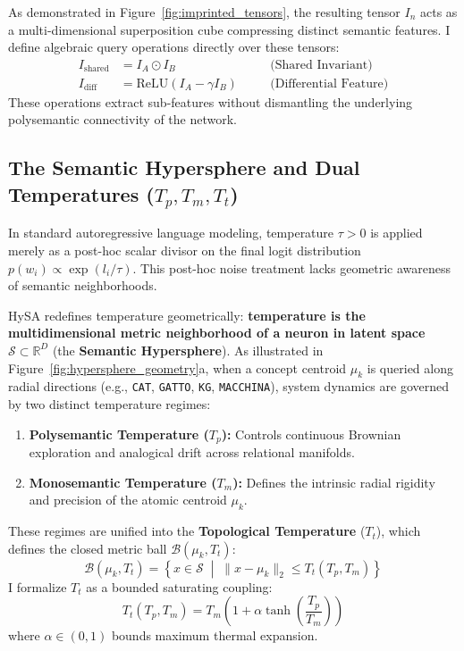\documentclass[10pt,twocolumn]{article}
\theoremstyle{definition}
\begin{document}
As demonstrated in Figure~\ref{fig:imprinted_tensors}, the resulting tensor $I_n$ acts as a multi-dimensional superposition cube compressing distinct semantic features. I define algebraic query operations directly over these tensors:
\begin{align}
    I_{\mathrm{shared}} &= I_A \odot I_B \quad &&\text{(Shared Invariant)} \\
    I_{\mathrm{diff}} &= \mathrm{ReLU}(I_A - \gamma I_B) \quad &&\text{(Differential Feature)}
\end{align}
These operations extract sub-features without dismantling the underlying polysemantic connectivity of the network.

\subsection{The Semantic Hypersphere and Dual Temperatures (\texorpdfstring{$T_p, T_m, T_t$}{Tp, Tm, Tt})}
In standard autoregressive language modeling, temperature $\tau > 0$ is applied merely as a post-hoc scalar divisor on the final logit distribution $p(w_i) \propto \exp(l_i / \tau)$. This post-hoc noise treatment lacks geometric awareness of semantic neighborhoods.

HySA redefines temperature geometrically: \textbf{temperature is the multidimensional metric neighborhood of a neuron in latent space $\mathcal{S} \subset \mathbb{R}^D$} (the \textbf{Semantic Hypersphere}). As illustrated in Figure~\ref{fig:hypersphere_geometry}a, when a concept centroid $\mu_k$ is queried along radial directions (e.g., \texttt{CAT}, \texttt{GATTO}, \texttt{KG}, \texttt{MACCHINA}), system dynamics are governed by two distinct temperature regimes:
\begin{enumerate}[leftmargin=*, itemsep=1.5pt]
    \item \textbf{Polysemantic Temperature ($T_p$):} Controls continuous Brownian exploration and analogical drift across relational manifolds.
    \item \textbf{Monosemantic Temperature ($T_m$):} Defines the intrinsic radial rigidity and precision of the atomic centroid $\mu_k$.
\end{enumerate}

These regimes are unified into the \textbf{Topological Temperature} ($T_t$), which defines the closed metric ball $\mathcal{B}(\mu_k, T_t)$:
\begin{equation}
    \mathcal{B}(\mu_k, T_t) = \left\{ x \in \mathcal{S} \;\middle|\; \| x - \mu_k \|_2 \le T_t(T_p, T_m) \right\}
\end{equation}
I formalize $T_t$ as a bounded saturating coupling:
\begin{equation}
    T_t(T_p, T_m) = T_m \left( 1 + \alpha \tanh\left( \frac{T_p}{T_m} \right) \right)
    \label{eq:tt_coupling}
\end{equation}
where $\alpha \in (0, 1)$ bounds maximum thermal expansion.
\end{document}
